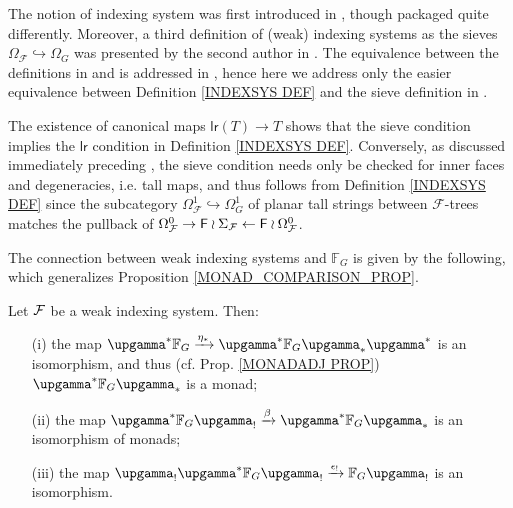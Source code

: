 \documentclass[a4paper,10pt]{article}%
\begin{document}
\begin{remark}
The notion of indexing system
was first introduced in \cite[Def. 3.22]{BH15}, though packaged quite differently.
Moreover, a third definition of (weak) indexing systems as the sieves 
$\Omega_{\mathcal{F}} \hookrightarrow \Omega_G$
was presented by the second author in \cite[\S 9]{Pe17}. The equivalence between the definitions in \cite{BH15} and \cite{Pe17} is addressed in 
\cite[Rmk. 9.7]{Pe17}, hence here we address only the easier equivalence between Definition \ref{INDEXSYS DEF} and the sieve definition in \cite[\S 9]{Pe17}.

The existence of canonical maps 
$\mathsf{lr}(T) \to T$ shows that the sieve condition
implies the $\mathsf{lr}$ condition
in Definition \ref{INDEXSYS DEF}. 
Conversely, as discussed immediately preceding \cite[Def. 9.5]{Pe17}, the sieve condition needs only be checked for inner faces and degeneracies, i.e. tall maps, and thus follows from Definition \ref{INDEXSYS DEF} since the subcategory 
$\Omega_{\mathcal{F}}^1 \hookrightarrow \Omega^1_G$ 
of planar tall strings between $\mathcal{F}$-trees
matches the pullback of
$\Omega_{\mathcal{F}}^0 \to
\mathsf{F} \wr \Sigma_{\mathcal{F}} \leftarrow 
\mathsf{F} \wr \Omega_{\mathcal{F}}^0
$.
\end{remark}


The connection between weak indexing systems and $\mathbb{F}_G$ is given by the following,
which generalizes 
Proposition \ref{MONAD_COMPARISON_PROP}.


\begin{proposition}\label{F_MONAD_COMPARISON_PROP}
	Let $\mathcal F$ be a weak indexing system. Then:
	\begin{itemize}
	\item[(i)] the map 
		$\upgamma^{\**} \mathbb{F}_G
		\xrightarrow{\eta_{\**}}
		\upgamma^{\**} \mathbb{F}_G \upgamma_{\**} \upgamma^{\**}$
		is an isomorphism,
		and thus (cf. Prop. \ref{MONADADJ PROP})
		$\upgamma^{\**} \mathbb{F}_G \upgamma_{\**}$
		is a monad;
	\item[(ii)] the map
		$\upgamma^{\**} \mathbb{F}_G \upgamma_{!}
		\xrightarrow{\beta}
		\upgamma^{\**} \mathbb{F}_G \upgamma_{\**}$ is an isomorphism of monads;
	\item[(iii)] the map
		$\upgamma_{!}\upgamma^{\**} \mathbb{F}_G \upgamma_{!}
		\xrightarrow{\epsilon_!}
		\mathbb{F}_G \upgamma_{!}$ is an isomorphism.
	\end{itemize}
\end{proposition}
\end{document}
